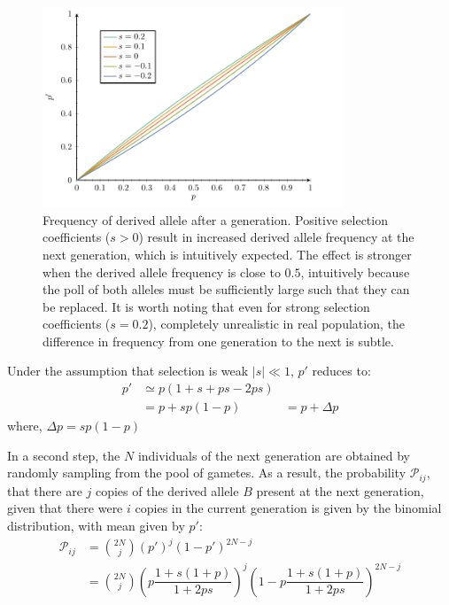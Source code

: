 \begin{figure}[H]
    \centering
    \includegraphics[width=0.8\textwidth, page=1] {figures.pdf}
    \caption[Frequency of derived {allele} after a generation]{
    Frequency of derived \gls{allele} after a generation.
    Positive selection coefficients ($s > 0$) result in increased derived \gls{allele} frequency at the next generation, which is intuitively expected.
    The effect is stronger when the derived \gls{allele} frequency is close to $0.5$, intuitively because the poll of both \glspl{allele} must be sufficiently large such that they can be replaced.
    It is worth noting that even for strong selection coefficients ($s=0.2$), completely unrealistic in real population, the difference in frequency from one generation to the next is subtle.}
\end{figure}

Under the assumption that selection is weak $|s| \ll 1$, $p'$ reduces to:
\begin{align}
    p' & \simeq p (1 + s + ps - 2ps) \\
    & = p + sp(1-p)
    & = p + \Delta p
\end{align}
where, $\Delta p = sp(1-p)$

In a second step, the $N$ individuals of the next generation are obtained by randomly sampling from the pool of gametes.
As a result, the probability $\mathcal{P}_{ij}$, that there are $j$ copies of the derived allele $B$ present at the next generation, given that there were $i$ copies in the current generation is given by the binomial distribution, with mean given by $p'$:
\begin{align}
    \mathcal{P}_{ij} & = \binom{2 N}{j} \left( p' \right)^j \left(1 - p' \right)^{2 N -j} \\
    & = \binom{2 N}{j} \left( p\dfrac{1+s(1+p)}{1 + 2ps} \right)^j \left(1 - p\dfrac{1+s(1+p)}{1 + 2ps} \right)^{2 N -j} \label{eq:binomial-WF}
\end{align}

